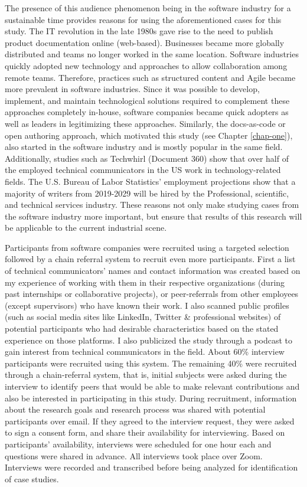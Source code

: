 The presence of this audience phenomenon being in the software industry for a sustainable time provides reasons for using the aforementioned cases for this study. The IT revolution in the late 1980s gave rise to the need to publish product documentation online (web-based). Businesses became more globally distributed and teams no longer worked in the same location. Software industries quickly adopted new technology and approaches to allow collaboration among remote teams. Therefore, practices such as structured content and Agile became more prevalent in software industries. Since it was possible to develop, implement, and maintain technological solutions required to complement these approaches completely in-house, software companies became quick adopters as well as leaders in legitimizing these approaches. Similarly, the docs-as-code or open authoring approach, which motivated this study (see Chapter \ref{chap-one}), also started in the software industry and is mostly popular in the same field. Additionally, studies such as Techwhirl (Document 360) show that over half of the employed technical communicators in the US work in technology-related fields. The U.S. Bureau of Labor Statistics’ employment projections show that a majority of writers from 2019-2029 will be hired by the Professional, scientific, and technical services industry. These reasons not only make studying cases from the software industry more important, but ensure that results of this research will be applicable to the current industrial scene.

Participants from software companies were recruited using a targeted selection followed by a chain referral system to recruit even more participants. First a list of technical communicators’ names and contact information was created based on my experience of working with them in their respective organizations (during past internships or collaborative projects), or peer-referrals from other employees (except supervisors) who have known their work. I also scanned public profiles (such as social media sites like LinkedIn, Twitter  \& professional websites) of potential participants who had desirable characteristics based on the stated experience on those platforms. I also publicized the study through a podcast to gain interest from technical communicators in the field. About 60\% interview participants were recruited using this system. The remaining 40\% were recruited through a chain-referral system, that is, initial subjects were asked during the interview to identify peers that would be able to make relevant contributions and also be interested in participating in this study. During recruitment, information about the research goals and research process was shared with potential participants over email. If they agreed to the interview request, they were asked to sign a consent form, and share their availability for interviewing. Based on participants’ availability, interviews were scheduled for one hour each and questions were shared in advance. All interviews took place over Zoom. Interviews were recorded and transcribed before being analyzed for identification of case studies.

